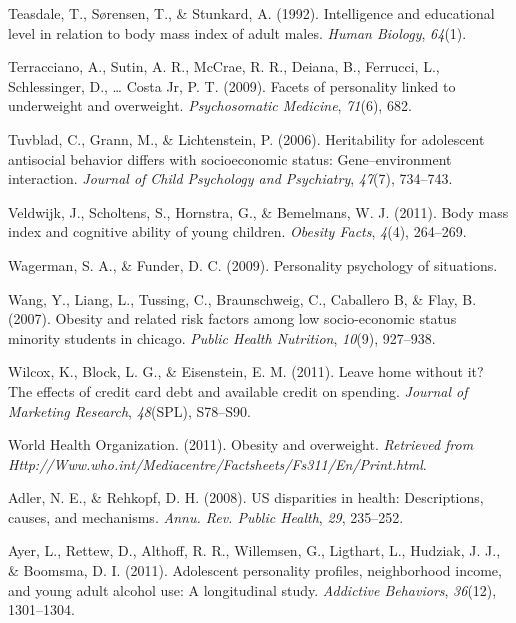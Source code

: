 \documentclass[man]{apa6}
\begin{document}
\leavevmode\hypertarget{ref-teasdale1992intelligence}{}%
Teasdale, T., Sørensen, T., \& Stunkard, A. (1992). Intelligence and educational level in relation to body mass index of adult males. \emph{Human Biology}, \emph{64}(1).

\leavevmode\hypertarget{ref-terracciano2009facets}{}%
Terracciano, A., Sutin, A. R., McCrae, R. R., Deiana, B., Ferrucci, L., Schlessinger, D., \ldots{} Costa Jr, P. T. (2009). Facets of personality linked to underweight and overweight. \emph{Psychosomatic Medicine}, \emph{71}(6), 682.

\leavevmode\hypertarget{ref-tuvblad2006heritability}{}%
Tuvblad, C., Grann, M., \& Lichtenstein, P. (2006). Heritability for adolescent antisocial behavior differs with socioeconomic status: Gene--environment interaction. \emph{Journal of Child Psychology and Psychiatry}, \emph{47}(7), 734--743.

\leavevmode\hypertarget{ref-veldwijk2011body}{}%
Veldwijk, J., Scholtens, S., Hornstra, G., \& Bemelmans, W. J. (2011). Body mass index and cognitive ability of young children. \emph{Obesity Facts}, \emph{4}(4), 264--269.

\leavevmode\hypertarget{ref-wagerman2009personality}{}%
Wagerman, S. A., \& Funder, D. C. (2009). Personality psychology of situations.

\leavevmode\hypertarget{ref-wang2007}{}%
Wang, Y., Liang, L., Tussing, C., Braunschweig, C., Caballero B, \& Flay, B. (2007). Obesity and related risk factors among low socio-economic status minority students in chicago. \emph{Public Health Nutrition}, \emph{10}(9), 927--938.

\leavevmode\hypertarget{ref-wilcox2011leave}{}%
Wilcox, K., Block, L. G., \& Eisenstein, E. M. (2011). Leave home without it? The effects of credit card debt and available credit on spending. \emph{Journal of Marketing Research}, \emph{48}(SPL), S78--S90.

\leavevmode\hypertarget{ref-who2011}{}%
World Health Organization. (2011). Obesity and overweight. \emph{Retrieved from Http://Www.who.int/Mediacentre/Factsheets/Fs311/En/Print.html}.

\leavevmode\hypertarget{ref-adler2008us}{}%
Adler, N. E., \& Rehkopf, D. H. (2008). US disparities in health: Descriptions, causes, and mechanisms. \emph{Annu. Rev. Public Health}, \emph{29}, 235--252.

\leavevmode\hypertarget{ref-ayer2011adolescent}{}%
Ayer, L., Rettew, D., Althoff, R. R., Willemsen, G., Ligthart, L., Hudziak, J. J., \& Boomsma, D. I. (2011). Adolescent personality profiles, neighborhood income, and young adult alcohol use: A longitudinal study. \emph{Addictive Behaviors}, \emph{36}(12), 1301--1304.
\end{document}
